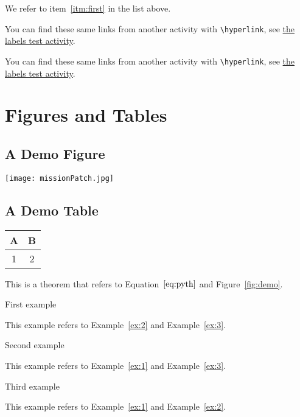 \documentclass[landscape]{ximera}
\begin{document}
We refer to item~\ref{itm:first} in the list above.

You can find these same links from another activity with \verb|\hyperlink|, see \hyperlink{xim_labelsFromOtherActivity}{the labels test activity}.

You can find these same links from another activity with \verb|\hyperlink|, see \hyperref[xim_labelsFromOtherActivity]{the labels test activity}.

\section{Figures and Tables}

\subsection{A Demo Figure}
\label{sec:fig}

\begin{image}[0.3\textwidth]
  \centering
  \texttt{[image: missionPatch.jpg]} %
\end{image}
  \label{fig:demo}

\subsection{A Demo Table}

{
  \centering
  \begin{tabular}{|c|c|}
    \hline
    A & B \\
    \hline
    1 & 2 \\
    \hline
  \end{tabular}
  \label{tab:example}
}

 \begin{theorem} \label{thm:1}
  
  This is a theorem that refers to Equation~$\eqref{eq:pyth}$ and Figure~\ref{fig:demo}.

  
 \end{theorem}

\begin{example} \label{ex:1}
 First example  

 This example refers to Example~\ref{ex:2} and Example~\ref{ex:3}.

\end{example}
\begin{example} \label{ex:2}
 Second example  

  This example refers to Example~\ref{ex:1} and Example~\ref{ex:3}.
\end{example}
\begin{example} \label{ex:3}
 Third example  

  This example refers to Example~\ref{ex:1} and Example~\ref{ex:2}.
\end{example}
\end{document}
